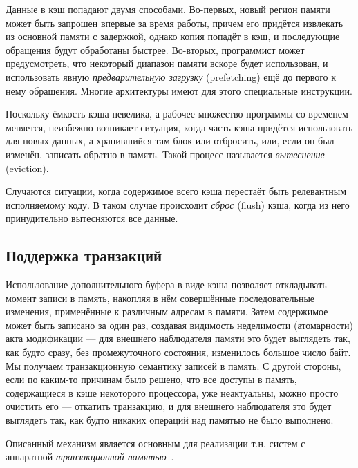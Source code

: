 Данные в кэш попадают двумя способами. Во-первых, новый регион памяти может быть запрошен впервые за время работы, причем его придётся извлекать из основной памяти с задержкой, однако копия попадёт в кэш, и последующие обращения будут обработаны быстрее. Во-вторых, программист может предусмотреть, что некоторый диапазон памяти вскоре будет использован, и использовать явную \textit{предварительную загрузку} (\abbr prefetching) ещё до первого к нему обращения. Многие архитектуры имеют для этого специальные инструкции.

Поскольку ёмкость кэша невелика, а рабочее множество программы со временем меняется, неизбежно возникает ситуация, когда часть кэша придётся использовать для новых данных, а хранившийся там блок или отбросить, или, если он был изменён, записать обратно в память. Такой процесс называется \textit{вытеснение} (\abbr eviction).

Случаются ситуации, когда содержимое всего кэша перестаёт быть релевантным исполняемому коду. В таком случае происходит \textit{сброс} (\abbr flush) кэша, когда из него принудительно вытесняются все данные.

\subsection{Поддержка транзакций}

Использование дополнительного буфера в виде кэша позволяет откладывать момент записи в память, накопляя в нём совершённые последовательные изменения, применённые к различным адресам в памяти. Затем содержимое может быть записано за один раз, создавая видимость неделимости (атомарности) акта модификации ---  для внешнего наблюдателя памяти это будет выглядеть так, как будто сразу, без промежуточного состояния, изменилось большое число байт. Мы получаем транзакционную семантику записей в память. С другой стороны, если по каким-то причинам было решено, что все доступы в память, содержащиеся в кэше некоторого процессора, уже неактуальны, можно просто очистить его --- откатить транзакцию, и для внешнего наблюдателя это будет выглядеть так, как будто никаких операций над памятью не было выполнено.

Описанный  механизм является основным для реализации т.н. систем с аппаратной \textit{транзакционной памятью}~\cite{rajwar2002}.

